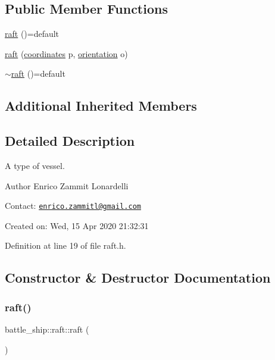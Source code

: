 \subsection*{Public Member Functions}
\begin{DoxyCompactItemize}
\item 
\hyperlink{classbattle__ship_1_1raft_acde3f010cdf8cb639c6c9996c4a31656}{raft} ()=default
\item 
\hyperlink{classbattle__ship_1_1raft_ab76a787da1c470907eb7e166af6e0db8}{raft} (\hyperlink{structbattle__ship_1_1coordinates}{coordinates} p, \hyperlink{namespacebattle__ship_aed87488f0a73f0d0679fe343fb61c784}{orientation} o)
\item 
\hyperlink{classbattle__ship_1_1raft_a4b381ef568f95e3fe097eeef75d2ac51}{$\sim$raft} ()=default
\end{DoxyCompactItemize}
\subsection*{Additional Inherited Members}


\subsection{Detailed Description}
A type of vessel. 

\begin{DoxyAuthor}{Author}
Enrico Zammit Lonardelli
\end{DoxyAuthor}
Contact\+: \href{mailto:enrico.zammitl@gmail.com}{\tt enrico.\+zammitl@gmail.\+com}

Created on\+: Wed, 15 Apr 2020 21\+:32\+:31 

Definition at line 19 of file raft.\+h.



\subsection{Constructor \& Destructor Documentation}
\mbox{\label{classbattle__ship_1_1raft_acde3f010cdf8cb639c6c9996c4a31656}} 
\subsubsection{\texorpdfstring{raft()}{raft()}\hspace{0.1cm}{\footnotesize\ttfamily [1/2]}}
{\footnotesize\ttfamily battle\+\_\+ship\+::raft\+::raft (\begin{DoxyParamCaption}{ }\end{DoxyParamCaption})\hspace{0.3cm}{\ttfamily [default]}}

